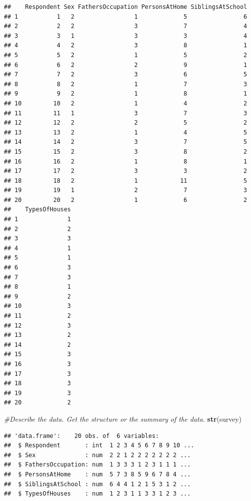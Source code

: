\documentclass[
]{article}
\newenvironment{Shaded}{\begin{snugshade}}{\end{snugshade}}
\newcommand{\CommentTok}[1]{\textcolor[rgb]{0.56,0.35,0.01}{\textit{#1}}}
\newcommand{\FunctionTok}[1]{\textcolor[rgb]{0.13,0.29,0.53}{\textbf{#1}}}
\newcommand{\NormalTok}[1]{#1}
\begin{document}
\begin{verbatim}
##    Respondent Sex FathersOccupation PersonsAtHome SiblingsAtSchool
## 1           1   2                 1             5                6
## 2           2   2                 3             7                4
## 3           3   1                 3             3                4
## 4           4   2                 3             8                1
## 5           5   2                 1             5                2
## 6           6   2                 2             9                1
## 7           7   2                 3             6                5
## 8           8   2                 1             7                3
## 9           9   2                 1             8                1
## 10         10   2                 1             4                2
## 11         11   1                 3             7                3
## 12         12   2                 2             5                2
## 13         13   2                 1             4                5
## 14         14   2                 3             7                5
## 15         15   2                 3             8                2
## 16         16   2                 1             8                1
## 17         17   2                 3             3                2
## 18         18   2                 1            11                5
## 19         19   1                 2             7                3
## 20         20   2                 1             6                2
##    TypesOfHouses
## 1              1
## 2              2
## 3              3
## 4              1
## 5              1
## 6              3
## 7              3
## 8              1
## 9              2
## 10             3
## 11             2
## 12             3
## 13             2
## 14             2
## 15             3
## 16             3
## 17             3
## 18             3
## 19             3
## 20             2
\end{verbatim}

\begin{Shaded}
\begin{Highlighting}[]
\CommentTok{\#Describe the data. Get the structure or the summary of the data.}
\FunctionTok{str}\NormalTok{(survey)}
\end{Highlighting}
\end{Shaded}

\begin{verbatim}
## 'data.frame':    20 obs. of  6 variables:
##  $ Respondent       : int  1 2 3 4 5 6 7 8 9 10 ...
##  $ Sex              : num  2 2 1 2 2 2 2 2 2 2 ...
##  $ FathersOccupation: num  1 3 3 3 1 2 3 1 1 1 ...
##  $ PersonsAtHome    : num  5 7 3 8 5 9 6 7 8 4 ...
##  $ SiblingsAtSchool : num  6 4 4 1 2 1 5 3 1 2 ...
##  $ TypesOfHouses    : num  1 2 3 1 1 3 3 1 2 3 ...
\end{verbatim}
\end{document}
